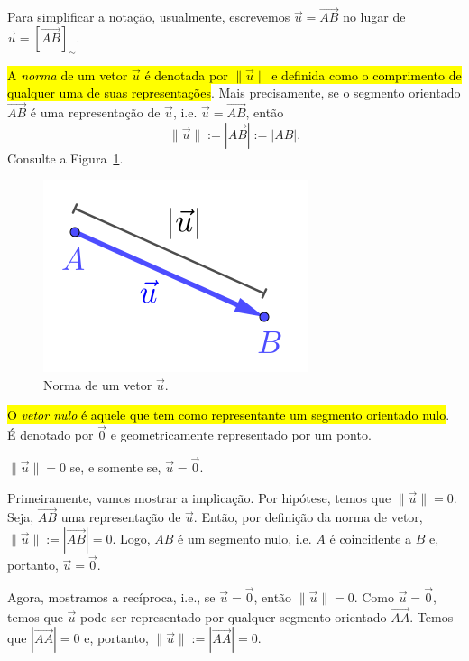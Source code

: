 \begin{obs}
  Para simplificar a notação, usualmente, escrevemos $\vec{u}=\overrightarrow{AB}$ no lugar de $\vec{u} = \left[\overrightarrow{AB}\right]_{\sim}$.
\end{obs}

\hl{A \emph{norma} de um vetor $\vec{u}$ é denotada por $\|\vec{u}\|$ e definida como o comprimento de qualquer uma de suas representações}. Mais precisamente, se o segmento orientado $\overrightarrow{AB}$ é uma representação de $\vec{u}$, i.e. $\vec{u} = \overrightarrow{AB}$, então
\begin{equation}
  \|\vec{u}\| := |\overrightarrow{AB}| := |AB|.
\end{equation}
Consulte a Figura~\ref{cap_vetor_sec_vetor:fig:vetor_norma}.

\begin{figure}[h]
  \centering
  \includegraphics{./cap_vetor/dados/fig_vetor_norma/fig.png}
  \caption{Norma de um vetor $\vec{u}$.}
  \label{cap_vetor_sec_vetor:fig:vetor_norma}
\end{figure}

\hl{O \emph{vetor nulo} é aquele que tem como representante um segmento orientado nulo}. É denotado por $\vec{0}$ e geometricamente representado por um ponto.

\begin{proposicao}
  $\|\vec{u}\| = 0$ se, e somente se, $\vec{u} = \vec{0}$.
\end{proposicao}
\begin{demonstracao}
  Primeiramente, vamos mostrar a implicação. Por hipótese, temos que $\|\vec{u}\| = 0$. Seja, $\overrightarrow{AB}$ uma representação de $\vec{u}$. Então, por definição da norma de vetor, $\|\vec{u}\| := \left|\overrightarrow{AB}\right| = 0$. Logo, $AB$ é um segmento nulo, i.e. $A$ é coincidente a $B$ e, portanto, $\vec{u} = \vec{0}$.

  Agora, mostramos a recíproca, i.e., se $\vec{u} = \vec{0}$, então $\|\vec{u}\| = 0$. Como $\vec{u} = \vec{0}$, temos que $\vec{u}$ pode ser representado por qualquer segmento orientado $\overrightarrow{AA}$. Temos que $\left|\overrightarrow{AA}\right| = 0$ e, portanto, $\|\vec{u}\| := \left|\overrightarrow{AA}\right| = 0$.
\end{demonstracao}

